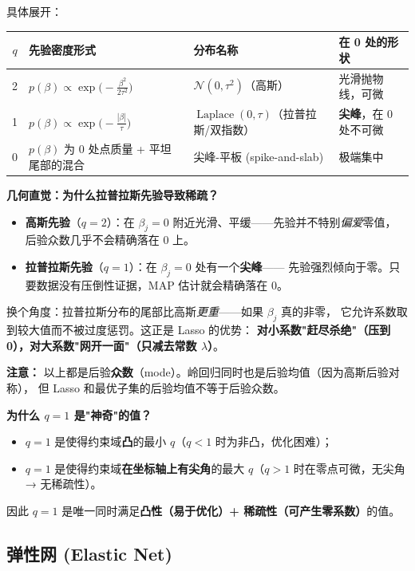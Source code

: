 具体展开：

\begin{center}
\renewcommand{\arraystretch}{1.8}
\small
\begin{tabular}{c|p{5.2cm}|p{3.2cm}|p{2.8cm}}
\toprule
$q$ & 先验密度形式 & 分布名称 & 在 0 处的形状 \\
\midrule
2 & $p(\beta) \propto \exp\!\big(-\frac{\beta^2}{2\tau^2}\big)$
   & $\mathcal{N}(0, \tau^2)$（高斯）
   & 光滑抛物线，可微 \\
1 & $p(\beta) \propto \exp\!\big(-\frac{|\beta|}{\tau}\big)$
   & $\operatorname{Laplace}(0, \tau)$（拉普拉斯/双指数）
   & \textbf{尖峰}，在 0 处不可微 \\
0 & $p(\beta)$ 为 0 处点质量 + 平坦尾部的混合
   & 尖峰-平板 (spike-and-slab)
   & 极端集中 \\
\bottomrule
\end{tabular}
\end{center}

\textbf{几何直觉：为什么拉普拉斯先验导致稀疏？}

\begin{itemize}
    \item \textbf{高斯先验}（$q=2$）：在 $\beta_j=0$ 附近光滑、平缓——先验并不特别\emph{偏爱}零值，
    后验众数几乎不会精确落在 0 上。
    \item \textbf{拉普拉斯先验}（$q=1$）：在 $\beta_j=0$ 处有一个\textbf{尖峰}——
    先验强烈倾向于零。只要数据没有压倒性证据，MAP 估计就会精确落在 0。
\end{itemize}

换个角度：拉普拉斯分布的尾部比高斯\emph{更重}——如果 $\beta_j$ 真的非零，
它允许系数取到较大值而不被过度惩罚。这正是 Lasso 的优势：
\textbf{对小系数"赶尽杀绝"（压到 0），对大系数"网开一面"（只减去常数 $\lambda$）}。

\textbf{注意：} 以上都是后验\textbf{众数}（mode）。岭回归同时也是后验均值（因为高斯后验对称），
但 Lasso 和最优子集的后验均值不等于后验众数。

\textbf{为什么 $q=1$ 是"神奇"的值？}
\begin{itemize}
    \item $q=1$ 是使得约束域\textbf{凸}的最小 $q$（$q<1$ 时为非凸，优化困难）；
    \item $q=1$ 是使得约束域\textbf{在坐标轴上有尖角}的最大 $q$（$q>1$ 时在零点可微，无尖角 → 无稀疏性）。
\end{itemize}
因此 $q=1$ 是唯一同时满足\textbf{凸性（易于优化）+ 稀疏性（可产生零系数）}的值。

\subsection{弹性网 (Elastic Net)}


